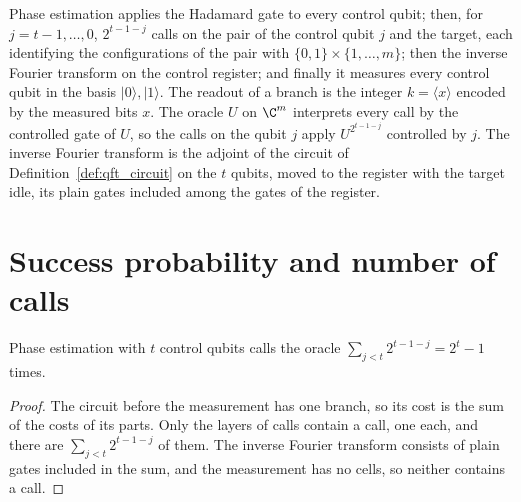 \begin{definition}
    \label{def:phase_estimation_circuit}
    \leanok
    Phase estimation \cite[Fig.~5.2 and~5.3]{NielsenChuang2010} applies the Hadamard
    gate to every control qubit; then, for $j=t-1,\dots,0$, $2^{t-1-j}$ calls on the
    pair of the control qubit $j$ and the target, each identifying the configurations
    of the pair with $\{0,1\}\times\{1,\dots,m\}$; then the inverse Fourier
    transform on the control register; and finally it measures every control qubit
    in the basis $\lvert0\rangle,\lvert1\rangle$. The readout of a branch is the
    integer $k=\langle x\rangle$ encoded by the measured bits $x$. The oracle $U$ on
    $\C^m$ interprets every call by the controlled gate of $U$, so the calls on the
    qubit $j$ apply $U^{2^{t-1-j}}$ controlled by $j$. The inverse Fourier transform
    is the adjoint of the circuit of Definition~\ref{def:qft_circuit} on the $t$
    qubits, moved to the register with the target idle, its plain gates included
    among the gates of the register.
\end{definition}

\section{Success probability and number of calls}
\label{sec:phase_estimation_bounds}

\begin{theorem}
    \label{thm:phase_estimation_query_count}
    \leanok
    Phase estimation with $t$ control qubits calls the oracle
    $\sum_{j<t}2^{t-1-j}=2^t-1$ times.
\end{theorem}
\begin{proof}\leanok
    The circuit before the measurement has one branch, so its cost is the sum of the
    costs of its parts. Only the layers of calls contain a call, one each, and there
    are $\sum_{j<t}2^{t-1-j}$ of them. The inverse Fourier transform consists of plain
    gates included in the sum, and the measurement has no cells, so neither contains a
    call.
\end{proof}

